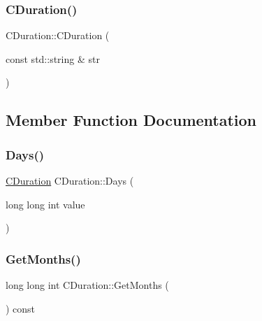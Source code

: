 \subsubsection{\texorpdfstring{C\+Duration()}{CDuration()}\hspace{0.1cm}{\footnotesize\ttfamily [2/2]}}
{\footnotesize\ttfamily C\+Duration\+::\+C\+Duration (\begin{DoxyParamCaption}\item[{const std\+::string \&}]{str }\end{DoxyParamCaption})\hspace{0.3cm}{\ttfamily [explicit]}}



\subsection{Member Function Documentation}
\mbox{\label{class_c_duration_a4d915b832c458ce651397df2dcc74311}} 
\subsubsection{\texorpdfstring{Days()}{Days()}}
{\footnotesize\ttfamily \mbox{\hyperlink{class_c_duration}{C\+Duration}} C\+Duration\+::\+Days (\begin{DoxyParamCaption}\item[{long long int}]{value }\end{DoxyParamCaption})\hspace{0.3cm}{\ttfamily [static]}}

\mbox{\label{class_c_duration_a95b4e8f27009897daa9f0d39e659f292}} 
\subsubsection{\texorpdfstring{Get\+Months()}{GetMonths()}}
{\footnotesize\ttfamily long long int C\+Duration\+::\+Get\+Months (\begin{DoxyParamCaption}{ }\end{DoxyParamCaption}) const\hspace{0.3cm}{\ttfamily [inline]}}

\mbox{\label{class_c_duration_a775dfa18b6c377ef658c332fd5228925}} 

